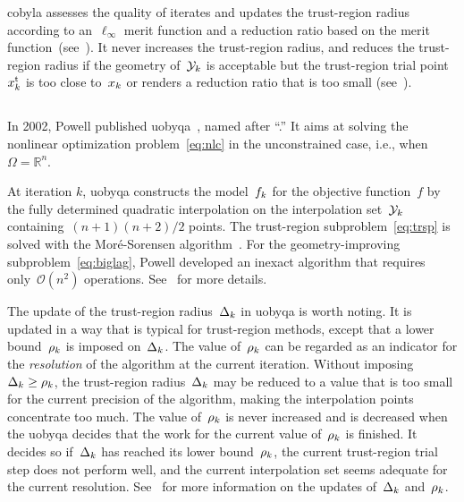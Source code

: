 \documentclass[
    smallextended,  %
    final,        %
]{svjour3}
\newcommand{\R}{\mathbb{R}}
\newcommand{\fset}{\Omega}
\newcommand{\iter}[1][k]{x\ifthenelse{\equal{#1}{}}{}{_{#1}}}
\newcommand{\objm}[1][k]{\obj\ifthenelse{\equal{#1}{}}{}{_{#1}}}
\newcommand{\obj}{f}
\newcommand{\rad}[1][k]{\Delta\ifthenelse{\equal{#1}{}}{}{_{#1}}}
\newcommand{\radlb}[1][k]{\rho\ifthenelse{\equal{#1}{}}{}{_{#1}}}
\newcommand{\trust}{{\text{t}}}
\newcommand{\xpt}[1][k]{\mathcal{Y}\ifthenelse{\equal{#1}{}}{}{_{#1}}}
\begin{document}
\gls{cobyla} assesses the quality of iterates and updates the trust-region radius according to
an~$\ell_\infty$ merit function and a reduction ratio based on the merit
function~(see~\cite[equations~(5),~(9), and~(10)]{Powell_1994}). It never increases
the trust-region radius, and reduces the trust-region radius if the geometry of~$\xpt$ is acceptable
but the trust-region trial point~$\iter^\trust$ is too close to~$\iter$ or renders a reduction ratio
that is too small (see~\cite[equation~(11)]{Powell_1994}).%


\subsection{}
\label{ssec:uobyqa}

In 2002, Powell published \gls{uobyqa}~\cite{Powell_2002}, named after ``.''
It aims at solving the nonlinear optimization problem~\eqref{eq:nlc} in the unconstrained case, i.e., when~$\fset = \R^n$.


At iteration $k$, \gls{uobyqa} constructs the model~$\objm$ for the objective function~$\obj$
by the fully determined quadratic interpolation on the interpolation set~$\xpt$ containing~$(n + 1)(n + 2) / 2$ points.
The trust-region subproblem~\eqref{eq:trsp} is solved with the Mor{\'{e}}-Sorensen algorithm~\cite{More_Sorensen_1983}.
For the geometry-improving subproblem~\eqref{eq:biglag}, Powell developed an inexact algorithm that requires only~$\mathcal{O}(n^2)$
operations. See~\cite[\S~2]{Powell_2002} for more details.

The update of the trust-region radius~$\rad$ in \gls{uobyqa} is worth noting.
It is updated in a way that is typical for trust-region methods, except that a  lower
bound~$\radlb$ is imposed on~$\rad$.
The value of~$\radlb[k]$ can be regarded as an indicator for the \emph{resolution} of the algorithm at the current iteration.
Without imposing~$\rad[k] \ge \radlb[k]$, the trust-region radius~$\rad[k]$ may be reduced to a
value that is too small for the current precision of the algorithm, making the interpolation points
concentrate too much.
The value of~$\radlb[k]$ is never increased and is decreased when the \gls{uobyqa} decides that the work for the current value of~$\radlb[k]$ is finished.
It decides so if~$\rad[k]$ has reached its lower bound~$\radlb[k]$,
the current trust-region trial step does not perform well,
and the current interpolation set seems adequate for the current resolution.
See~\cite[\S~3]{Powell_2002} for more information on the updates of~$\rad$ and~$\radlb[k]$.
\end{document}
